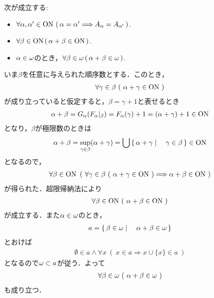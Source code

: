 	\begin{screen}
		\begin{thm}[順序数の加法]\label{thm:the_definition_of_addition_of_ordinal_numbers}
			次が成立する:
			\begin{itemize}
				\item $\forall \alpha,\alpha' \in \mathrm{ON}\, \left(\, \alpha = \alpha' \Longrightarrow A_\alpha = A_{\alpha'}\, \right)$.
				\item $\forall \beta \in \mathrm{ON}\, (\, \alpha + \beta \in \mathrm{ON}\, )$.
				\item $\alpha \in {\bf \omega}$のとき，$\forall \beta \in {\bf \omega}\, (\, \alpha + \beta \in {\bf \omega}\, )$.
			\end{itemize}
		\end{thm}
	\end{screen}
	
	\begin{prf}
		いま$\beta$を任意に与えられた順序数とする．このとき，
		\begin{align}
			\forall \gamma \in \beta\ (\ \alpha + \gamma \in \mathrm{ON}\ )
		\end{align}
		が成り立っていると仮定すると，$\beta = \gamma + 1$と表せるとき
		\begin{align}
			\alpha + \beta 
			= G_\alpha (F_\alpha|_\beta)
			= F_\alpha(\gamma) + 1
			= (\alpha + \gamma) + 1 \in \mathrm{ON}
		\end{align}
		となり，$\beta$が極限数のときは
		\begin{align}
			\alpha + \beta = \operatorname*{sup}_{\gamma \in \beta} (\alpha + \gamma)
			= \bigcup \left\{\, \alpha + \gamma \mid \quad \gamma \in \beta\, \right\}
			\in \mathrm{ON}
		\end{align}
		となるので，
		\begin{align}
			\forall \beta \in \ON\ \left(\ \forall \gamma \in \beta\ (\ \alpha + \gamma \in \ON\ ) \Longrightarrow \alpha + \beta \in \ON\ \right)
		\end{align}
		が得られた．超限帰納法により
		\begin{align}
			\forall \beta \in \mathrm{ON}\ (\ \alpha + \beta \in \mathrm{ON}\ )
		\end{align}
		が成立する．また$\alpha \in {\bf \omega}$のとき，
		\begin{align}
			a = \left\{\, \beta \in {\bf \omega} \mid \quad \alpha + \beta \in {\bf \omega}\, \right\}
		\end{align}
		とおけば
		\begin{align}
			\emptyset \in a \wedge \forall x\ (\ x \in a \Longrightarrow x \cup \{x\} \in a\ )
		\end{align}
		となるので${\bf \omega} \subset a$が従う．よって
		\begin{align}
			\forall \beta \in {\bf \omega}\ 
			(\ \alpha + \beta \in {\bf \omega}\ )
		\end{align}
		も成り立つ．
		\QED
	\end{prf}
	
